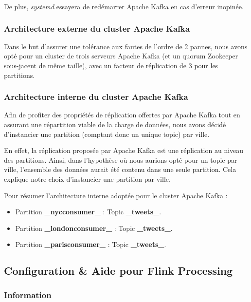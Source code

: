 \documentclass[a4paper,oneside,12pt]{article}
\begin{document}
De plus, \textit{systemd} essayera de redémarrer Apache Kafka en cas d'erreur
inopinée.

\subsubsection{Architecture externe du cluster Apache Kafka}

Dans le but d'assurer une tolérance aux fautes de l'ordre de 2 pannes, nous
avons opté pour un cluster de trois serveurs Apache Kafka (et un quorum Zookeeper
sous-jacent de même taille), avec un facteur de réplication de 3 pour les partitions.

\subsubsection{Architecture interne du cluster Apache Kafka}

Afin de profiter des propriétés de réplication offertes par Apache Kafka tout
en assurant une répartition viable de la charge de données, nous avons
décidé d'instancier une partition (comptant donc un unique topic) par ville.

En effet, la réplication proposée par Apache Kafka est une réplication au
niveau des partitions. Ainsi, dans l'hypothèse où nous aurions opté pour un
topic par ville, l'ensemble des données aurait été contenu dans une seule
partition. Cela explique notre choix d'instancier une partition par ville.

Pour résumer l'architecture interne adoptée pour le cluster Apache Kafka :
\begin{itemize}
\item Partition \textbf{\_nycconsumer\_} :
   Topic \textbf{\_tweets\_}.
\item Partition \textbf{\_londonconsumer\_} :
  Topic \textbf{\_tweets\_}.
\item Partition \textbf{\_parisconsumer\_} :
  Topic \textbf{\_tweets\_}.
\end{itemize}
  
  

\pagebreak
\subsection{Configuration \& Aide pour Flink Processing}

\subsubsection{Information}
\end{document}
